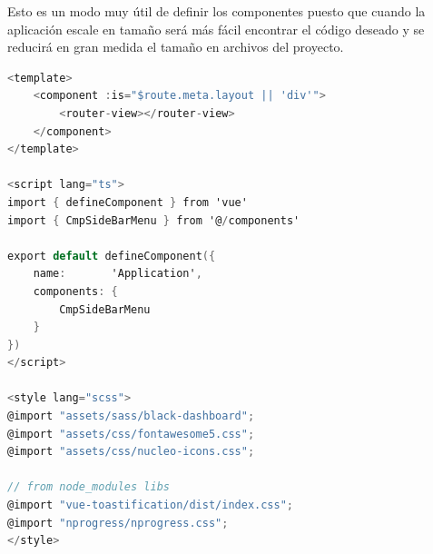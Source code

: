Esto es un modo muy útil de definir los componentes puesto que cuando la aplicación escale en tamaño será más fácil encontrar el código deseado y se reducirá en gran medida el tamaño en archivos del proyecto.

\begin{lstlisting}[language=C,caption={Código del archivo App.vue}, label={lst:app}]
<template>
    <component :is="$route.meta.layout || 'div'">
        <router-view></router-view>
    </component>
</template>

<script lang="ts">
import { defineComponent } from 'vue'
import { CmpSideBarMenu } from '@/components'

export default defineComponent({
    name:       'Application',
    components: {
        CmpSideBarMenu
    }
})
</script>

<style lang="scss">
@import "assets/sass/black-dashboard";
@import "assets/css/fontawesome5.css";
@import "assets/css/nucleo-icons.css";

// from node_modules libs
@import "vue-toastification/dist/index.css";
@import "nprogress/nprogress.css";
</style>
\end{lstlisting}

